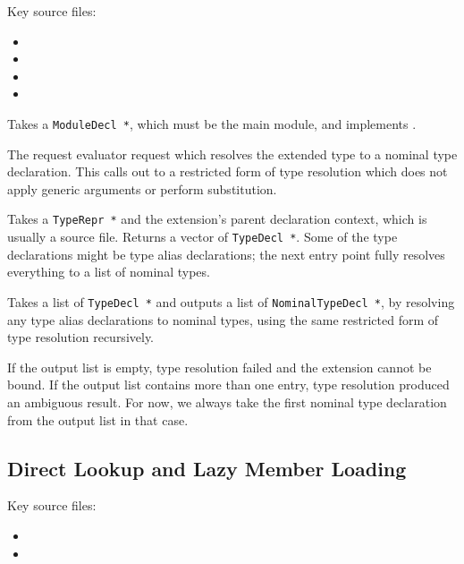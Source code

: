 \documentclass[../generics]{subfiles}
\begin{document}
Key source files:
\begin{itemize}
\item {}
\item {}
\item {}
\item {}
\end{itemize}

Takes a \texttt{ModuleDecl *}, which must be the main module, and implements .

The request evaluator request which resolves the extended type to a nominal type declaration. This calls out to a restricted form of type resolution which does not apply generic arguments or perform substitution.

Takes a \texttt{TypeRepr *} and the extension's parent declaration context, which is usually a source file. Returns a vector of \texttt{TypeDecl *}. Some of the type declarations might be type alias declarations; the next entry point fully resolves everything to a list of nominal types.

Takes a list of \texttt{TypeDecl *} and outputs a list of \texttt{NominalTypeDecl *}, by resolving any type alias declarations to nominal types, using the same restricted form of type resolution recursively.

If the output list is empty, type resolution failed and the extension cannot be bound. If the output list contains more than one entry, type resolution produced an ambiguous result. For now, we always take the first nominal type declaration from the output list in that case.

\subsection*{Direct Lookup and Lazy Member Loading}

Key source files:
\begin{itemize}
\item {}
\item {}
\end{itemize}
\end{document}
